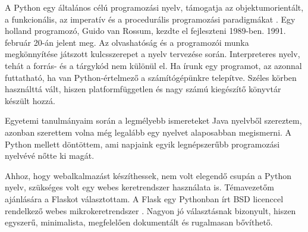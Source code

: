 






A Python egy általános célú programozási nyelv, támogatja az objektumorientált, a funkcionális, az imperatív és a procedurális programozási paradigmákat \cite{python}. Egy holland programozó, Guido van Rossum, kezdte el fejleszteni 1989-ben. 1991. február 20-án jelent meg. Az olvashatóság és a programozói munka megkönnyítése játszott kulcsszerepet a nyelv tervezése során. Interpreteres nyelv, tehát a forrás- és a tárgykód nem különül el. Ha írunk egy programot, az azonnal futtatható, ha van Python-értelmező a számítógépünkre telepítve. Széles körben használttá vált, hiszen platformfüggetlen és nagy számú kiegészítő könyvtár készült hozzá.

Egyetemi tanulmányaim során a legmélyebb ismereteket Java nyelvből szereztem, azonban szerettem volna még legalább egy nyelvet alaposabban megismerni. A Python mellett döntöttem, ami napjaink egyik legnépszerűbb programozási nyelvévé nőtte ki magát.


Ahhoz, hogy webalkalmazást készíthessek, nem volt elegendő csupán a Python nyelv, szükséges volt egy webes keretrendszer használata is. Témavezetőm ajánlására a Flaskot választottam. A Flask egy Pythonban írt BSD licenccel rendelkező webes mikrokeretrendszer \cite{flask}. Nagyon jó választásnak bizonyult, hiszen egyszerű, minimalista, megfelelően dokumentált és rugalmasan bővíthető.

